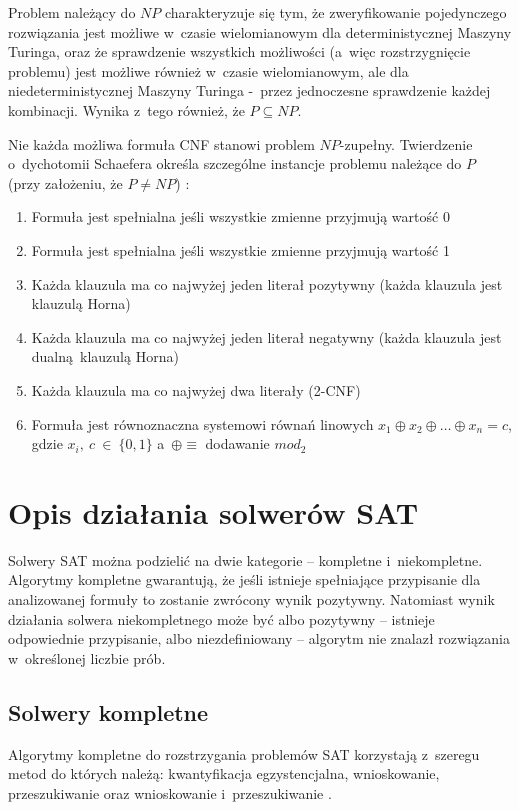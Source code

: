 Problem należący do $NP$ charakteryzuje się tym, że zweryfikowanie pojedynczego rozwiązania jest możliwe w~czasie wielomianowym
dla deterministycznej Maszyny Turinga, oraz że sprawdzenie wszystkich możliwości (a~więc rozstrzygnięcie problemu) jest możliwe
również w~czasie wielomianowym, ale dla niedeterministycznej Maszyny Turinga -~przez jednoczesne sprawdzenie każdej kombinacji. 
Wynika z~tego również, że $P \subseteq NP$.

Nie każda możliwa formuła CNF stanowi problem $NP$-zupełny. Twierdzenie o~dychotomii Schaefera określa 
szczególne instancje problemu należące do $P$ (przy założeniu, że $P \neq NP$) \cite{schaefer-dichotomy}:

\begin{enumerate}
    \item Formuła jest spełnialna jeśli wszystkie zmienne przyjmują wartość 0
    \item Formuła jest spełnialna jeśli wszystkie zmienne przyjmują wartość 1
    \item Każda klauzula ma co najwyżej jeden literał pozytywny (każda klauzula jest klauzulą Horna)
    \item Każda klauzula ma co najwyżej jeden literał negatywny (każda klauzula jest dualną klauzulą Horna)
    \item Każda klauzula ma co najwyżej dwa literały (2-CNF)
    \item Formuła jest równoznaczna systemowi równań linowych $x_1 \oplus x_2 \oplus \dots \oplus x_n = c$, gdzie
    $x_i,~c~\in~\{0, 1\}$ a~$\oplus \equiv$ dodawanie $mod_2$
    
\end{enumerate}

\section{Opis działania solwerów SAT}
Solwery SAT można podzielić na dwie kategorie -- kompletne i~niekompletne.
Algorytmy kompletne gwarantują, że jeśli istnieje spełniające przypisanie dla analizowanej formuły to zostanie zwrócony wynik pozytywny.
Natomiast wynik działania solwera niekompletnego może być albo pozytywny -- istnieje odpowiednie przypisanie, albo niezdefiniowany -- algorytm nie
znalazł rozwiązania w~określonej liczbie prób.

\subsection{Solwery kompletne}
Algorytmy kompletne do rozstrzygania problemów SAT korzystają z~szeregu metod do których należą: 
kwantyfikacja egzystencjalna, wnioskowanie, przeszukiwanie oraz wnioskowanie i~przeszukiwanie \cite{handbook-satifiability-complete}.

